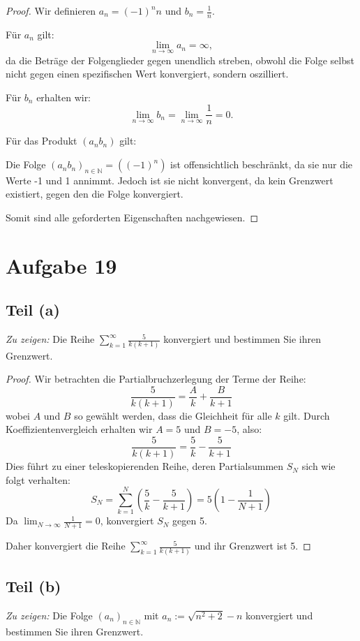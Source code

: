 \documentclass{article}
\theoremstyle{definition}
\theoremstyle{remark}
\begin{document}
\begin{proof}
	Wir definieren \( a_n = (-1)^n n \) und \( b_n = \frac{1}{n} \).

	Für \( a_n \) gilt:
	\[ \lim_{n \to \infty} a_n = \infty, \]
	da die Beträge der Folgenglieder gegen unendlich streben, obwohl die Folge selbst nicht gegen einen spezifischen Wert konvergiert, sondern oszilliert.

	Für \( b_n \) erhalten wir:
	\[ \lim_{n \to \infty} b_n = \lim_{n \to \infty} \frac{1}{n} = 0. \]

	Für das Produkt \( (a_n b_n) \) gilt:

	Die Folge \( (a_n b_n)_{n \in \mathbb{N}} = ((-1)^n) \) ist offensichtlich beschränkt, da sie nur die Werte -1 und 1 annimmt. Jedoch ist sie nicht konvergent, da kein Grenzwert existiert, gegen den die Folge konvergiert.

	Somit sind alle geforderten Eigenschaften nachgewiesen.
\end{proof}


\section*{Aufgabe 19}

\subsection*{Teil (a)}
\textit{Zu zeigen:} Die Reihe \(\sum_{k=1}^{\infty} \frac{5}{k(k+1)}\) konvergiert und bestimmen Sie ihren Grenzwert.

\begin{proof}
	Wir betrachten die Partialbruchzerlegung der Terme der Reihe:
	\[ \frac{5}{k(k+1)} = \frac{A}{k} + \frac{B}{k+1} \]
	wobei \( A \) und \( B \) so gewählt werden, dass die Gleichheit für alle \( k \) gilt. Durch Koeffizientenvergleich erhalten wir \( A = 5 \) und \( B = -5 \), also:
	\[ \frac{5}{k(k+1)} = \frac{5}{k} - \frac{5}{k+1} \]
	Dies führt zu einer teleskopierenden Reihe, deren Partialsummen \( S_N \) sich wie folgt verhalten:
	\[ S_N = \sum_{k=1}^{N} \left( \frac{5}{k} - \frac{5}{k+1} \right) = 5 \left( 1 - \frac{1}{N+1} \right) \]
	Da \( \lim_{N \to \infty} \frac{1}{N+1} = 0 \), konvergiert \( S_N \) gegen 5.

	Daher konvergiert die Reihe \(\sum_{k=1}^{\infty} \frac{5}{k(k+1)}\) und ihr Grenzwert ist 5.
\end{proof}

\subsection*{Teil (b)}
\textit{Zu zeigen:} Die Folge \( (a_n)_{n\in\mathbb{N}} \) mit \( a_n := \sqrt{n^2 + 2} - n \) konvergiert und bestimmen Sie ihren Grenzwert.
\end{document}
